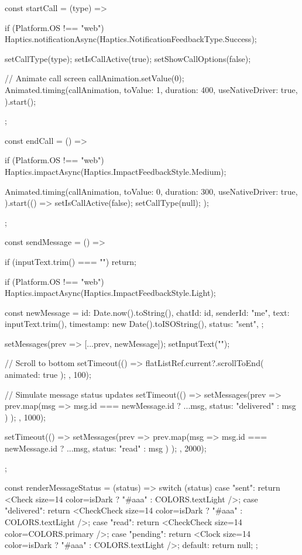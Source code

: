 {  const startCall = (type) => {
    if (Platform.OS !== "web") {
      Haptics.notificationAsync(Haptics.NotificationFeedbackType.Success);
    }
    
    setCallType(type);
    setIsCallActive(true);
    setShowCallOptions(false);
    
    // Animate call screen
    callAnimation.setValue(0);
    Animated.timing(callAnimation, {
      toValue: 1,
      duration: 400,
      useNativeDriver: true,
    }).start();
  };

  const endCall = () => {
    if (Platform.OS !== "web") {
      Haptics.impactAsync(Haptics.ImpactFeedbackStyle.Medium);
    }
    
    Animated.timing(callAnimation, {
      toValue: 0,
      duration: 300,
      useNativeDriver: true,
    }).start(() => {
      setIsCallActive(false);
      setCallType(null);
    });
  };
  
  const sendMessage = () => {
    if (inputText.trim() === "") return;
    
    if (Platform.OS !== "web") {
      Haptics.impactAsync(Haptics.ImpactFeedbackStyle.Light);
    }
    
    const newMessage = {
      id: Date.now().toString(),
      chatId: id,
      senderId: "me",
      text: inputText.trim(),
      timestamp: new Date().toISOString(),
      status: "sent",
    };
    
    setMessages(prev => [...prev, newMessage]);
    setInputText("");
    
    // Scroll to bottom
    setTimeout(() => {
      flatListRef.current?.scrollToEnd({ animated: true });
    }, 100);
    
    // Simulate message status updates
    setTimeout(() => {
      setMessages(prev =>
        prev.map(msg =>
          msg.id === newMessage.id ? { ...msg, status: "delivered" } : msg
        )
      );
    }, 1000);
    
    setTimeout(() => {
      setMessages(prev =>
        prev.map(msg =>
          msg.id === newMessage.id ? { ...msg, status: "read" } : msg
        )
      );
    }, 2000);
  };
  
  const renderMessageStatus = (status) => {
    switch (status) {
      case "sent":
        return <Check size={14} color={isDark ? "#aaa" : COLORS.textLight} />;
      case "delivered":
        return <CheckCheck size={14} color={isDark ? "#aaa" : COLORS.textLight} />;
      case "read":
        return <CheckCheck size={14} color={COLORS.primary} />;
      case "pending":
        return <Clock size={14} color={isDark ? "#aaa" : COLORS.textLight} />;
      default:
        return null;
    }
  };
  
}
